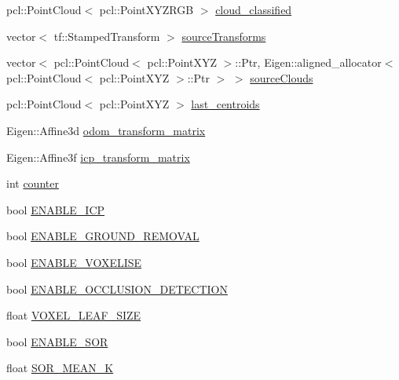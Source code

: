 \begin{DoxyCompactItemize}
\item 
pcl\+::\+Point\+Cloud$<$ pcl\+::\+Point\+X\+Y\+Z\+R\+GB $>$ \hyperlink{classdatmo_1_1cloud__segmentation_a42f9f6610cf798f8ac26c0c5500ccf02}{cloud\+\_\+classified}
\item 
vector$<$ tf\+::\+Stamped\+Transform $>$ \hyperlink{classdatmo_1_1cloud__segmentation_a24a81e37b2eff06482f65b09e39af9e4}{source\+Transforms}
\item 
vector$<$ pcl\+::\+Point\+Cloud$<$ pcl\+::\+Point\+X\+YZ $>$\+::Ptr, Eigen\+::aligned\+\_\+allocator$<$ pcl\+::\+Point\+Cloud$<$ pcl\+::\+Point\+X\+YZ $>$\+::Ptr $>$ $>$ \hyperlink{classdatmo_1_1cloud__segmentation_abcf359aaf4f17128e961473692d9c473}{source\+Clouds}
\item 
pcl\+::\+Point\+Cloud$<$ pcl\+::\+Point\+X\+YZ $>$ \hyperlink{classdatmo_1_1cloud__segmentation_a576b87bb01fef0d14ba862f08ca8e2ba}{last\+\_\+centroids}
\item 
Eigen\+::\+Affine3d \hyperlink{classdatmo_1_1cloud__segmentation_a9f47c2e7cba42121779e2772a052f58b}{odom\+\_\+transform\+\_\+matrix}
\item 
Eigen\+::\+Affine3f \hyperlink{classdatmo_1_1cloud__segmentation_ac7762960a72df80afdf8bedd59335ddc}{icp\+\_\+transform\+\_\+matrix}
\item 
int \hyperlink{classdatmo_1_1cloud__segmentation_a56499171fe846acfb2a73a5134261a91}{counter}
\item 
bool \hyperlink{classdatmo_1_1cloud__segmentation_a71c4d63aacea33f4c1b172e1ff723163}{E\+N\+A\+B\+L\+E\+\_\+\+I\+CP}
\item 
bool \hyperlink{classdatmo_1_1cloud__segmentation_a03474f362047eb23fbcc53e5ce943148}{E\+N\+A\+B\+L\+E\+\_\+\+G\+R\+O\+U\+N\+D\+\_\+\+R\+E\+M\+O\+V\+AL}
\item 
bool \hyperlink{classdatmo_1_1cloud__segmentation_aa3af9f5d3b0072cba61c14cff25965cb}{E\+N\+A\+B\+L\+E\+\_\+\+V\+O\+X\+E\+L\+I\+SE}
\item 
bool \hyperlink{classdatmo_1_1cloud__segmentation_a5f7ffa75c60af605cc914de7296cddb1}{E\+N\+A\+B\+L\+E\+\_\+\+O\+C\+C\+L\+U\+S\+I\+O\+N\+\_\+\+D\+E\+T\+E\+C\+T\+I\+ON}
\item 
float \hyperlink{classdatmo_1_1cloud__segmentation_af6f1f8553f2a18176ae84b78ddea07c9}{V\+O\+X\+E\+L\+\_\+\+L\+E\+A\+F\+\_\+\+S\+I\+ZE}
\item 
bool \hyperlink{classdatmo_1_1cloud__segmentation_ae54c11225658974ed8a37a03815aab0e}{E\+N\+A\+B\+L\+E\+\_\+\+S\+OR}
\item 
float \hyperlink{classdatmo_1_1cloud__segmentation_abb5b1262c14e68886e01e0230c530b07}{S\+O\+R\+\_\+\+M\+E\+A\+N\+\_\+K}

\end{DoxyCompactItemize}
